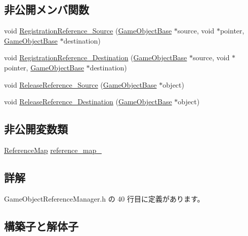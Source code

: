 \subsection*{非公開メンバ関数}
\begin{DoxyCompactItemize}
\item 
void \mbox{\hyperlink{class_game_object_reference_manager_aa4ca837b7d576db6b11745b2f8530b4d}{Registration\+Reference\+\_\+\+Source}} (\mbox{\hyperlink{class_game_object_base}{Game\+Object\+Base}} $\ast$source, void $\ast$pointer, \mbox{\hyperlink{class_game_object_base}{Game\+Object\+Base}} $\ast$destination)
\item 
void \mbox{\hyperlink{class_game_object_reference_manager_a8aaa23d4a8644a100b7154c92b845f78}{Registration\+Reference\+\_\+\+Destination}} (\mbox{\hyperlink{class_game_object_base}{Game\+Object\+Base}} $\ast$source, void $\ast$pointer, \mbox{\hyperlink{class_game_object_base}{Game\+Object\+Base}} $\ast$destination)
\item 
void \mbox{\hyperlink{class_game_object_reference_manager_afe2c3af4a929f25c87ac2253d9b763f7}{Release\+Reference\+\_\+\+Source}} (\mbox{\hyperlink{class_game_object_base}{Game\+Object\+Base}} $\ast$object)
\item 
void \mbox{\hyperlink{class_game_object_reference_manager_af3583b94e782a7a881abba2f6be2888c}{Release\+Reference\+\_\+\+Destination}} (\mbox{\hyperlink{class_game_object_base}{Game\+Object\+Base}} $\ast$object)
\end{DoxyCompactItemize}
\subsection*{非公開変数類}
\begin{DoxyCompactItemize}
\item 
\mbox{\hyperlink{struct_game_object_reference_manager_1_1_reference_map}{Reference\+Map}} \mbox{\hyperlink{class_game_object_reference_manager_a1aa067e575ad467741f671fd867e5638}{reference\+\_\+map\+\_\+}}
\end{DoxyCompactItemize}


\subsection{詳解}


 Game\+Object\+Reference\+Manager.\+h の 40 行目に定義があります。



\subsection{構築子と解体子}
\mbox{\label{class_game_object_reference_manager_aed165af9f1a16894c65f974945020cda}} 
